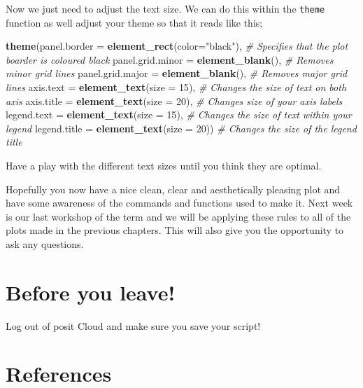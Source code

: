 \documentclass[
]{book}
\newenvironment{Shaded}{\begin{snugshade}}{\end{snugshade}}
\newcommand{\AttributeTok}[1]{\textcolor[rgb]{0.13,0.29,0.53}{#1}}
\newcommand{\CommentTok}[1]{\textcolor[rgb]{0.56,0.35,0.01}{\textit{#1}}}
\newcommand{\DecValTok}[1]{\textcolor[rgb]{0.00,0.00,0.81}{#1}}
\newcommand{\FunctionTok}[1]{\textcolor[rgb]{0.13,0.29,0.53}{\textbf{#1}}}
\newcommand{\NormalTok}[1]{#1}
\newcommand{\StringTok}[1]{\textcolor[rgb]{0.31,0.60,0.02}{#1}}
\begin{document}
Now we just need to adjust the text size. We can do this within the \texttt{theme} function as well adjust your theme so that it reads like this;

\begin{Shaded}
\begin{Highlighting}[]
\FunctionTok{theme}\NormalTok{(}\AttributeTok{panel.border =} \FunctionTok{element\_rect}\NormalTok{(}\AttributeTok{color=}\StringTok{"black"}\NormalTok{), }\CommentTok{\# Specifies that the plot boarder is coloured black}
        \AttributeTok{panel.grid.minor =} \FunctionTok{element\_blank}\NormalTok{(), }\CommentTok{\# Removes minor grid lines }
        \AttributeTok{panel.grid.major =} \FunctionTok{element\_blank}\NormalTok{(), }\CommentTok{\# Removes major grid lines }
        \AttributeTok{axis.text =} \FunctionTok{element\_text}\NormalTok{(}\AttributeTok{size =} \DecValTok{15}\NormalTok{), }\CommentTok{\# Changes the size of text on both axis }
        \AttributeTok{axis.title =} \FunctionTok{element\_text}\NormalTok{(}\AttributeTok{size =} \DecValTok{20}\NormalTok{), }\CommentTok{\# Changes size of your axis labels }
        \AttributeTok{legend.text =} \FunctionTok{element\_text}\NormalTok{(}\AttributeTok{size =} \DecValTok{15}\NormalTok{), }\CommentTok{\# Changes the size of text within your legend}
        \AttributeTok{legend.title =} \FunctionTok{element\_text}\NormalTok{(}\AttributeTok{size =} \DecValTok{20}\NormalTok{)) }\CommentTok{\# Changes the size of the legend title}
\end{Highlighting}
\end{Shaded}

Have a play with the different text sizes until you think they are optimal.

Hopefully you now have a nice clean, clear and aesthetically pleasing plot and have some awareness of the commands and functions used to make it. Next week is our last workshop of the term and we will be applying these rules to all of the plots made in the previous chapters. This will also give you the opportunity to ask any questions.

\hypertarget{before-you-leave-5}{%
\section{Before you leave!}\label{before-you-leave-5}}

Log out of posit Cloud and make sure you save your script!

\hypertarget{references-6}{%
\section{References}\label{references-6}}
\end{document}
